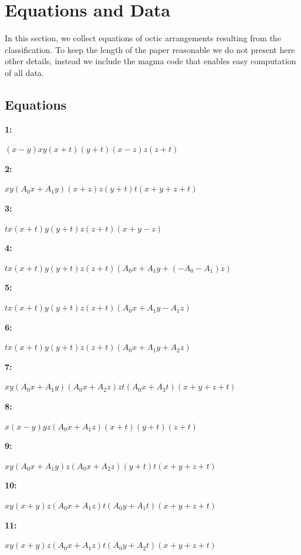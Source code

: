 \documentclass[12pt]{amsart}
\theoremstyle{plain}
\theoremstyle{remark}
\theoremstyle{definition}
\numberwithin{table}{section}
\begin{document}
\section{Equations and Data}\label{sec:EqsData}
In this section, we collect equations of octic arrangements resulting from the classification. To keep the length of the paper reasonable we do not present here other details, instead we include the magma code that enables easy computation of all data.
\subsection{Equations}
\leavevmode\small
\medskip

\medskip

\noindent\parbox[right]{9mm}{\textbf{1:}}\parbox{3mm}{\hfill}%
\parbox[t]{15cm}{\((x - y)xy(x + t)(y + t)(x - z)z(z + t)\)}

\noindent\parbox[right]{9mm}{\textbf{2:}}\parbox{3mm}{\hfill}%
\parbox[t]{15cm}{\(xy(A_{0}x + A_{1}y)(x + z)z(y + t)t(x + y + z + t)\)}

\noindent\parbox[right]{9mm}{\textbf{3:}}\parbox{3mm}{\hfill}%
\parbox[t]{15cm}{\(tx(x + t)y(y + t)z(z + t)(x + y - z)\)}

\noindent\parbox[right]{9mm}{\textbf{4:}}\parbox{3mm}{\hfill}%
\parbox[t]{15cm}{\(tx(x + t)y(y + t)z(z + t)(A_{0}x + A_{1}y + (-A_{0} - A_{1})z)\)}

\noindent\parbox[right]{9mm}{\textbf{5:}}\parbox{3mm}{\hfill}%
\parbox[t]{15cm}{\(tx(x + t)y(y + t)z(z + t)(A_{0}x + A_{1}y - A_{1}z)\)}

\noindent\parbox[right]{9mm}{\textbf{6:}}\parbox{3mm}{\hfill}%
\parbox[t]{15cm}{\(tx(x + t)y(y + t)z(z + t)(A_{0}x + A_{1}y + A_{2}z)\)}

\noindent\parbox[right]{9mm}{\textbf{7:}}\parbox{3mm}{\hfill}%
\parbox[t]{15cm}{\(xy(A_{0}x + A_{1}y)(A_{0}x + A_{2}z)zt(A_{0}x + A_{3}t)(x + y + z + t)\)}

\noindent\parbox[right]{9mm}{\textbf{8:}}\parbox{3mm}{\hfill}%
\parbox[t]{15cm}{\(x(x - y)yz(A_{0}x + A_{1}z)(x + t)(y + t)(z + t)\)}

\noindent\parbox[right]{9mm}{\textbf{9:}}\parbox{3mm}{\hfill}%
\parbox[t]{15cm}{\(xy(A_{0}x + A_{1}y)z(A_{0}x + A_{2}z)(y + t)t(x + y + z + t)\)}

\noindent\parbox[right]{9mm}{\textbf{10:}}\parbox{3mm}{\hfill}%
\parbox[t]{15cm}{\(xy(x + y)z(A_{0}x + A_{1}z)t(A_{0}y + A_{1}t)(x + y + z + t)\)}

\noindent\parbox[right]{9mm}{\textbf{11:}}\parbox{3mm}{\hfill}%
\parbox[t]{15cm}{\(xy(x + y)z(A_{0}x + A_{1}z)t(A_{0}y + A_{2}t)(x + y + z + t)\)}
\end{document}
